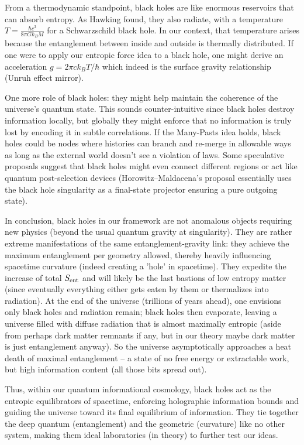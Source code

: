 \documentclass[11pt]{article}
\begin{document}
From a thermodynamic standpoint, black holes are like enormous reservoirs that can absorb entropy. As Hawking found, they also radiate, with a temperature $T = \frac{\hbar c^3}{8\pi G k_B M}$ for a Schwarzschild black hole. In our context, that temperature arises because the entanglement between inside and outside is thermally distributed. If one were to apply our entropic force idea to a black hole, one might derive an acceleration $g = 2\pi c k_B T/\hbar$ which indeed is the surface gravity relationship (Unruh effect mirror).

One more role of black holes: they might help maintain the coherence of the universe’s quantum state. This sounds counter-intuitive since black holes destroy information locally, but globally they might enforce that no information is truly lost by encoding it in subtle correlations. If the Many-Pasts idea holds, black holes could be nodes where histories can branch and re-merge in allowable ways as long as the external world doesn’t see a violation of laws. Some speculative proposals suggest that black holes might even connect different regions or act like quantum post-selection devices (Horowitz–Maldacena’s proposal essentially uses the black hole singularity as a final-state projector ensuring a pure outgoing state).

In conclusion, black holes in our framework are not anomalous objects requiring new physics (beyond the usual quantum gravity at singularity). They are rather extreme manifestations of the same entanglement-gravity link: they achieve the maximum entanglement per geometry allowed, thereby heavily influencing spacetime curvature (indeed creating a 'hole' in spacetime). They expedite the increase of total $S_{\rm ent}$ and will likely be the last bastions of low entropy matter (since eventually everything either gets eaten by them or thermalizes into radiation). At the end of the universe (trillions of years ahead), one envisions only black holes and radiation remain; black holes then evaporate, leaving a universe filled with diffuse radiation that is almost maximally entropic (aside from perhaps dark matter remnants if any, but in our theory maybe dark matter is just entanglement anyway). So the universe asymptotically approaches a heat death of maximal entanglement – a state of no free energy or extractable work, but high information content (all those bits spread out).

Thus, within our quantum informational cosmology, black holes act as the entropic equilibrators of spacetime, enforcing holographic information bounds and guiding the universe toward its final equilibrium of information. They tie together the deep quantum (entanglement) and the geometric (curvature) like no other system, making them ideal laboratories (in theory) to further test our ideas.
\end{document}
